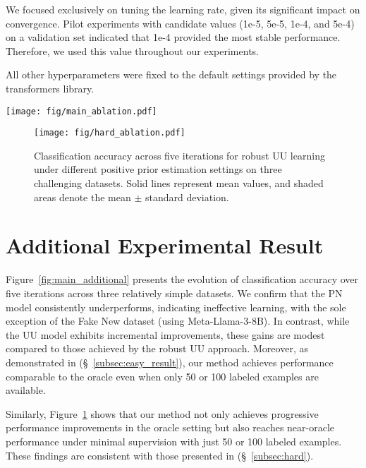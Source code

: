 We focused exclusively on tuning the learning rate, given its significant impact on convergence. Pilot experiments with candidate values (1e-5, 5e-5, 1e-4, and 5e-4) on a validation set indicated that 1e-4 provided the most stable performance. Therefore, we used this value throughout our experiments.

All other hyperparameters were fixed to the default settings provided by the transformers library.

\begin{figure*}[h]
    \centering
    \texttt{[image: fig/main\_ablation.pdf]}
    \caption{Classification accuracy across five iterations for PN, UU, robust UU (oracle), robust UU (50-labeled), and robust UU (100-labeled) on three relatively simple datasets. Solid lines represent mean values, and shaded areas denote the mean $\pm$ standard deviation.}
    \label{fig:main_additional}
\end{figure*}

\begin{figure}[h]
    \centering
    \texttt{[image: fig/hard\_ablation.pdf]}
    \caption{Classification accuracy across five iterations for robust UU learning under different positive prior estimation settings on three challenging datasets. Solid lines represent mean values, and shaded areas denote the mean $\pm$ standard deviation.}
    \label{fig:hard_additional}
\end{figure}

\section{Additional Experimental Result}

Figure~\ref{fig:main_additional} presents the evolution of classification accuracy over five iterations across three relatively simple datasets. We confirm that the PN model consistently underperforms, indicating ineffective learning, with the sole exception of the Fake New dataset (using Meta-Llama-3-8B). In contrast, while the UU model exhibits incremental improvements, these gains are modest compared to those achieved by the robust UU approach. Moreover, as demonstrated in (\S~\ref{subsec:easy_result}), our method achieves performance comparable to the oracle even when only 50 or 100 labeled examples are available.

Similarly, Figure~\ref{fig:hard_additional} shows that our method not only achieves progressive performance improvements in the oracle setting but also reaches near-oracle performance under minimal supervision with just 50 or 100 labeled examples. These findings are consistent with those presented in (\S~\ref{subsec:hard}).


